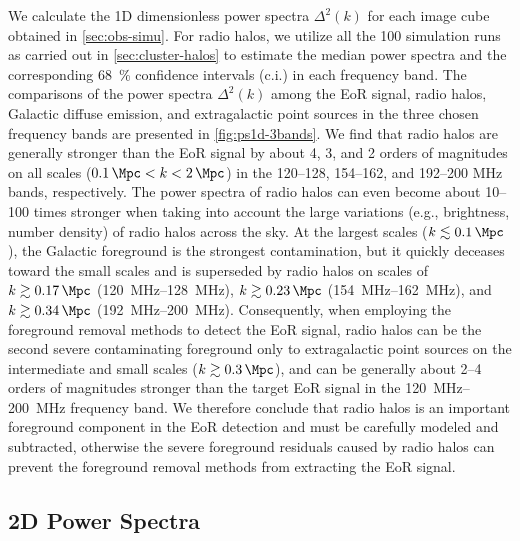 \documentclass[modern]{aastex62}
\begin{document}
{\color{cyan}%
We calculate the 1D dimensionless power spectra $\Delta^2(k)$ for each
image cube obtained in \autoref{sec:obs-simu}.
For radio halos, we utilize all the 100 simulation runs as carried out
in \autoref{sec:cluster-halos} to estimate the median power spectra and
the corresponding \SI{68}{\percent} confidence intervals (c.i.) in each
frequency band.
The comparisons of the power spectra $\Delta^2(k)$ among the EoR signal,
radio halos, Galactic diffuse emission, and extragalactic point sources
in the three chosen frequency bands are presented in
\autoref{fig:ps1d-3bands}.
We find that radio halos are generally stronger than the EoR signal by
about 4, 3, and 2 orders of magnitudes on all scales
($\SI{0.1}{\per\Mpc} < k < \SI{2}{\per\Mpc}$) in the \numrange{120}{128},
\numrange{154}{162}, and \numrange{192}{200} \si{\MHz} bands, respectively.
The power spectra of radio halos can even become about \numrange{10}{100}
times stronger when taking into account the large variations (e.g.,
brightness, number density) of radio halos across the sky.
At the largest scales ($k \lesssim \SI{0.1}{\per\Mpc}$), the Galactic
foreground is the strongest contamination, but it quickly deceases
toward the small scales and is superseded by radio halos on scales of
$k \gtrsim \SI{0.17}{\per\Mpc}$ (\SIrange{120}{128}{\MHz}),
$k \gtrsim \SI{0.23}{\per\Mpc}$ (\SIrange{154}{162}{\MHz}), and
$k \gtrsim \SI{0.34}{\per\Mpc}$ (\SIrange{192}{200}{\MHz}).
Consequently, when employing the foreground removal methods to detect
the EoR signal, radio halos can be the second severe contaminating
foreground only to extragalactic point sources on the intermediate and
small scales ($k \gtrsim \SI{0.3}{\per\Mpc}$), and can be generally
about \numrange{2}{4} orders of magnitudes stronger than the target
EoR signal in the \SIrange{120}{200}{\MHz} frequency band.
We therefore conclude that radio halos is an important foreground
component in the EoR detection and must be carefully modeled and
subtracted, otherwise the severe foreground residuals caused by radio
halos can prevent the foreground removal methods from extracting the
EoR signal.
} %

\subsection{2D Power Spectra}
\label{sec:ps2d}
\end{document}
